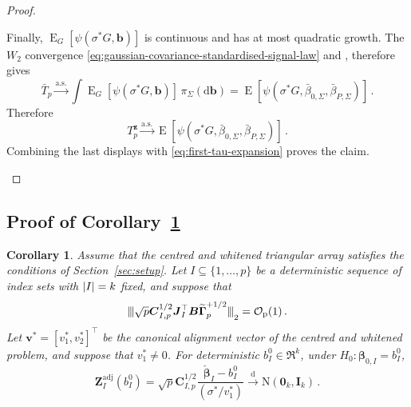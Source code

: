 \documentclass{article}
\makeatletter
\DeclareMathOperator{\expect}{E}
\newtheorem{corollary}[theorem]{Corollary}
\theoremstyle{definition}
\newcommand{\abs}[1]{%
	\ensuremath{%
		\if@display
		\left| #1 \right|
		\else
		\lvert #1 \rvert
		\fi
	}%
}
\newcommand{\mnorms}[1]{{\vert\kern-0.25ex\vert\kern-0.25ex\vert #1
		\vert\kern-0.25ex\vert\kern-0.25ex\vert}}
\newcommand*{\bb}{\boldsymbol}
\def\bv{\bb{v}}
\def\bbeta{\bb{\beta}}
\makeatother
\begin{document}
\begin{bibunit}
\begin{proof}
\begin{enumerate}[label=(\roman{*})]
Finally,
$\expect_G[\psi(\sigma^*G,\bb b)]$ is continuous and has at
most quadratic growth. The $W_2$ convergence
\eqref{eq:gaussian-covariance-standardised-signal-law}
and \citet[Theorem~6.9]{villani:2009}, therefore gives
$$
    \bar T_p
    \overset{\mathrm{a.s.}}{\longrightarrow}
    \int
    \expect_G[\psi(\sigma^*G,\bb b)]
    \,\pi_\Sigma(\mathrm d\bb b)
    =
    \expect
    \left[
        \psi(\sigma^*G,\bar\beta_{0,\Sigma},\bar\beta_{P,\Sigma})
    \right]\,.
$$
Therefore
$$
    T_p^{\bb z}
    \overset{\mathrm{a.s.}}{\longrightarrow}
    \expect
    \left[
        \psi
        \left(
            \sigma^*G,
            \bar\beta_{0,\Sigma},
            \bar\beta_{P,\Sigma}
        \right)
    \right] \,.
$$
Combining the last displays with \eqref{eq:first-tau-expansion} proves the claim.
\end{enumerate}
\end{proof}


\subsection{Proof of Corollary~\ref{cor:gaussian-covariance-adjusted-z}}
\label{sec:proof-gaussian-covariance-adjusted-z}

\begingroup
\renewcommand{\thetheorem}{\arabic{theorem}}
\renewcommand{\thecorollary}{\arabic{theorem}}
\setcounter{theorem}{1}
\begin{corollary}

\label{cor:gaussian-covariance-adjusted-z}
Assume that the centred and whitened triangular array satisfies the
conditions of Section~\ref{sec:setup}. Let
$I\subseteq\{1,\ldots,p\}$ be a deterministic sequence of index sets
with $\abs{I}=k$ fixed, and suppose that
\begin{equation}
\label{eq:covariance-adjusted-z-leverage}
    \mnorms{
        \sqrt p
        \bb C_{I,p}^{1/2}
        \bb J_I^\top
        \bb B
        \widetilde{\bb\Gamma}_p^{+1/2}
    }_2
    =
    \mathcal O_{\mathrm p}(1) \,.
\end{equation}
Let
$\bv^*=[v_1^*,v_2^*]^\top$
be the canonical alignment vector of the centred and whitened problem, and
suppose that $v_1^*\neq0$. For deterministic
$b_I^0\in\Re^k$, under
$
    H_0:
    \bbeta_{0,I}=b_I^0
$,
\begin{equation}
\label{eq:covariance-adjusted-z-limit}
    \bb Z_I^{\mathrm{adj}}(b_I^0)
    =
    \sqrt p  \bb C_{I,p}^{1/2} \frac{\check{\bbeta}_I-b_I^0}{(\sigma^* / v_1^*)}
    \overset{\mathrm d}{\longrightarrow}
    \mathrm N(\bb0_k,\bb I_k)\,.
\end{equation}


\end{corollary}
\end{bibunit}
\end{document}
